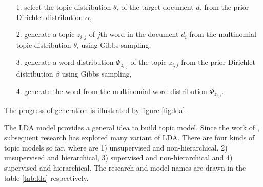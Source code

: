 \begin{itemize}
    \item[1.] select the topic distribution $\theta_i$ of the target document $d_i$ from the prior Dirichlet distribution $\alpha$, 
    \item[2.] generate a topic $z_{i,j}$ of $j$th word in the document $d_i$ from the multinomial topic distribution $\theta_i$ using Gibbs sampling,
    \item[3.] generate a word distribution $\Phi_{z_{i,j}}$ of the topic $z_{i,j}$ from the prior Dirichlet distribution $\beta$ using Gibbs sampling, 
    \item[4.] generate the word from the multinomial word distribution $\Phi_{z_{i,j}}$. 
\end{itemize}

The progress of generation is illustrated by figure \ref{fig:lda}.

The LDA model provides a general idea to build topic model. Since the work of \cite{Blei:2003}, subsequent research has explored many variant of LDA. There are four kinds of topic models so far, where are 1) unsupervised and non-hierarchical, 2) unsupervised and hierarchical, 3) supervised and non-hierarchical and 4) supervised and hierarchical. The research and model names are drawn in the table \ref{tab:lda} respectively.

\begin{table}[!htb]
\centering
{}
\caption{Topic Models Variant of LDA}
\label{tab:lda}
\end{table}


